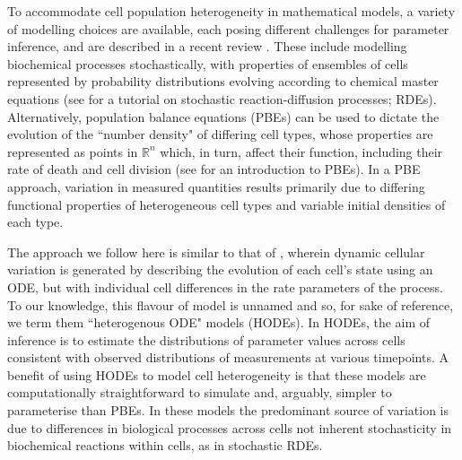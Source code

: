 \documentclass[10pt,letterpaper]{article}
\begin{document}
To accommodate cell population heterogeneity in mathematical models, a variety of modelling choices are available, each posing different challenges for parameter inference, and are described in a recent review \cite{waldherr2018estimation}. These include modelling biochemical processes stochastically, with properties of ensembles of cells represented by probability distributions evolving according to chemical master equations (see \cite{erban2007practical} for a tutorial on stochastic reaction-diffusion processes; RDEs). Alternatively, population balance equations (PBEs) can be used to dictate the evolution of the ``number density" of differing cell types, whose properties are represented as points in $\mathbb{R}^n$ which, in turn, affect their function, including their rate of death and cell division (see \cite{ramkrishna2014population} for an introduction to PBEs). In a PBE approach, variation in measured quantities results primarily due to differing functional properties of heterogeneous cell types and variable initial densities of each type. 

The approach we follow here is similar to that of \cite{dixit2018maximum}, wherein dynamic cellular variation is generated by describing the evolution of each cell's state using an ODE, but with individual cell differences in the rate parameters of the process. To our knowledge, this flavour of model is unnamed and so, for sake of reference, we term them ``heterogenous ODE" models (HODEs). In HODEs, the aim of inference is to estimate the distributions of parameter values across cells consistent with observed distributions of measurements at various timepoints. A benefit of using HODEs to model cell heterogeneity is that these models are computationally straightforward to simulate and, arguably, simpler to parameterise than PBEs. In these models the predominant source of variation is due to differences in biological processes across cells not inherent stochasticity in biochemical reactions within cells, as in stochastic RDEs.
\end{document}
